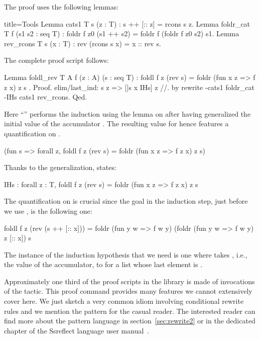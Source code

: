 The proof uses the following lemmas:

\begin{coq}{}{title=Tools}
Lemma cats1 T s (z : T) : s ++ [:: z] = rcons s z.
Lemma foldr_cat T f (s1 s2 : seq T) :
  foldr f z0 (s1 ++ s2) = foldr f (foldr f z0 s2) s1.
Lemma rev_rcons T s (x : T) : rev (rcons s x) = x :: rev s.
\end{coq}

The complete proof script follows:

\begin{coq}{}{}
Lemma foldl_rev T A f (z : A) (s : seq T) :
  foldl f z (rev s) = foldr (fun x z => f z x) z s .
Proof.
elim/last_ind: s z => [|s x IHs] z //.
by rewrite -cats1 foldr_cat -IHs cats1 rev_rcons.
Qed.
\end{coq}

Here ``'' performs the induction using the
 lemma on  after having generalized the initial value of
the accumulator .  The resulting value for  hence
features a quantification on .

\begin{coq}{}{}
(fun s => forall z, foldl f z (rev s) = foldr (fun x z => f z x) z s)
\end{coq}

Thanks to the generalization,  states:

\begin{coq}{}{}
IHs : forall z : T, foldl f z (rev s) = foldr (fun x z => f z x) z s
\end{coq}
The quantification on  is crucial since the goal in the induction step,
just before we use , is the following one:

\begin{coqout}{}{}
foldl f z (rev (s ++ [:: x])) =
  foldr (fun y w => f w y) (foldr (fun y w => f w y) z [:: x]) s
\end{coqout}

The instance of the induction hypothesis that we need is
one where  takes ,
i.e., the value of the accumulator, to  for a list
whose last element is .

\label{sec:rewrite}

Approximately one third of the proof scripts in the \mcbMC{} library is made of
invocations of the  tactic. This proof command provides many
features we cannot extensively cover here.  We just sketch a very common idiom
involving conditional rewrite rules and we mention the  pattern for
the casual reader.  The interested reader can find more about the pattern
language in section~\ref{sec:rewrite2} or in the dedicated chapter of
the Ssreflect language user manual~\cite{ssrman}.

